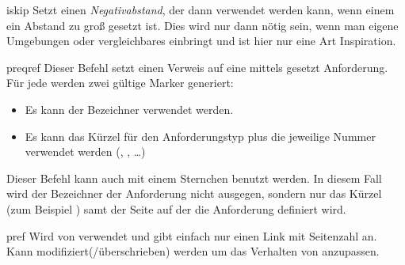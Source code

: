 \documentclass{sopra-base}
\begin{document}
\begin{command}{iskip}{}
    Setzt einen \emph{Negativabstand}, der dann verwendet werden kann, wenn einem ein Abstand zu groß gesetzt ist. Dies wird nur dann nötig sein, wenn man eigene Umgebungen oder vergleichbares einbringt und ist hier nur eine Art Inspiration.
\end{command}

\begin{command}{preqref}{}
    Dieser Befehl setzt einen Verweis auf eine mittels  gesetzt Anforderung. Für jede werden zwei gültige Marker generiert: \begin{itemize}\setlength{\itemsep}{0pt}
        \item Es kann der Bezeichner verwendet werden.
        \item Es kann das Kürzel für den Anforderungstyp plus die jeweilige Nummer verwendet werden (, , \ldots)
    \end{itemize}
    Dieser Befehl kann auch mit einem Sternchen benutzt werden. In diesem Fall wird der
    Bezeichner der Anforderung nicht ausgegen, sondern nur das Kürzel (zum Beispiel ) samt der Seite auf der die Anforderung definiert wird.
\end{command}

\begin{command}{pref}{}
    Wird von  verwendet und gibt einfach nur einen Link mit Seitenzahl an.
    Kann modifiziert(/überschrieben) werden um das Verhalten von  anzupassen.
\end{command}
\end{document}
